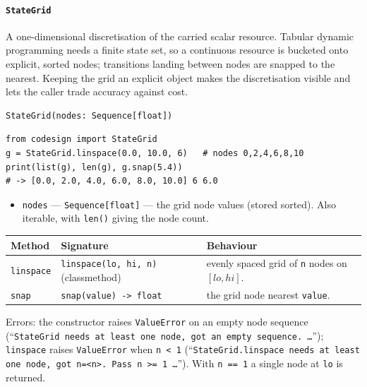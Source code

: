 \documentclass[11pt,a4paper]{article}
\begin{document}
\paragraph{\texttt{StateGrid}}\label{ref:dynamic:stategrid}
A one-dimensional discretisation of the carried scalar resource. Tabular
dynamic programming needs a finite state set, so a continuous resource is
bucketed onto explicit, sorted nodes; transitions landing between nodes are
snapped to the nearest. Keeping the grid an explicit object makes the
discretisation visible and lets the caller trade accuracy against cost.
\begin{lstlisting}
StateGrid(nodes: Sequence[float])
\end{lstlisting}
\begin{lstlisting}
from codesign import StateGrid
g = StateGrid.linspace(0.0, 10.0, 6)   # nodes 0,2,4,6,8,10
print(list(g), len(g), g.snap(5.4))
# -> [0.0, 2.0, 4.0, 6.0, 8.0, 10.0] 6 6.0
\end{lstlisting}
\begin{itemize}[nosep]
  \item \texttt{nodes} --- \texttt{Sequence[float]} --- the grid node values
    (stored sorted). Also iterable, with \texttt{len()} giving the node
    count.
\end{itemize}
\begin{center}
\begin{tabular}{@{}lll@{}}
\toprule
Method & Signature & Behaviour \\
\midrule
\texttt{linspace} & \texttt{linspace(lo, hi, n)} (classmethod) &
  evenly spaced grid of \texttt{n} nodes on $[lo, hi]$. \\
\texttt{snap} & \texttt{snap(value) -> float} &
  the grid node nearest \texttt{value}. \\
\bottomrule
\end{tabular}
\end{center}
Errors: the constructor raises \texttt{ValueError} on an empty node
sequence (``\texttt{StateGrid needs at least one node, got an empty
sequence.\ \ldots}''); \texttt{linspace} raises \texttt{ValueError} when
\texttt{n < 1} (``\texttt{StateGrid.linspace needs at least one node, got
n=<n>.\ Pass n >= 1 \ldots}''). With \texttt{n == 1} a single node at
\texttt{lo} is returned.
\end{document}
